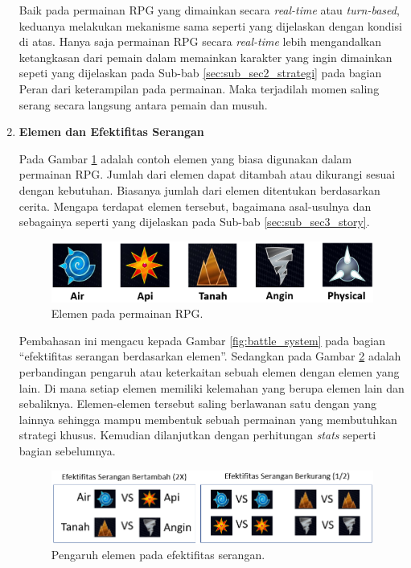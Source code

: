 \begin{enumerate}[label=\textbf{\arabic*).}]
	Baik pada permainan RPG yang dimainkan secara \textit{real-time} atau \textit{turn-based}, keduanya melakukan mekanisme sama seperti yang dijelaskan dengan kondisi di atas. Hanya saja permainan RPG secara \textit{real-time} lebih mengandalkan ketangkasan dari pemain dalam memainkan karakter yang ingin dimainkan sepeti yang dijelaskan pada Sub-bab \ref{sec:sub_sec2_strategi} pada bagian Peran dari keterampilan pada permainan. Maka terjadilah momen saling serang secara langsung antara pemain dan musuh.
	
	\item \textbf{Elemen dan Efektifitas Serangan}
	
	Pada Gambar \ref{fig:elemen} adalah contoh elemen yang biasa digunakan dalam permainan RPG. Jumlah dari elemen dapat ditambah atau dikurangi sesuai dengan kebutuhan. Biasanya jumlah dari elemen ditentukan berdasarkan cerita. Mengapa terdapat elemen tersebut, bagaimana asal-usulnya dan sebagainya seperti yang dijelaskan pada Sub-bab \ref{sec:sub_sec3_story}.
	\vspace{1ex}
	
	\begin{figure} [!h] \centering
		\includegraphics[scale=0.40]{img/element.png}
		\caption{Elemen pada permainan RPG.}
		\label{fig:elemen}
	\end{figure}
	
	Pembahasan ini mengacu kepada Gambar \ref{fig:battle_system} pada bagian ``efektifitas serangan berdasarkan elemen''. Sedangkan pada Gambar \ref{fig:efektifitas} adalah perbandingan pengaruh atau keterkaitan sebuah elemen dengan elemen yang lain. Di mana setiap elemen memiliki kelemahan yang berupa elemen lain dan sebaliknya. Elemen-elemen tersebut saling berlawanan satu dengan yang lainnya sehingga mampu membentuk sebuah permainan yang membutuhkan strategi khusus. Kemudian dilanjutkan dengan perhitungan \textit{stats} seperti bagian sebelumnya.
	\vspace{1ex}
	
	\begin{figure} [!h] \centering
		\includegraphics[scale=0.58]{img/efektifitas.png}
		\caption{Pengaruh elemen pada efektifitas serangan.}
		\label{fig:efektifitas}
	\end{figure}
	

\end{enumerate}
